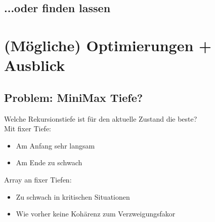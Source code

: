 \documentclass[12pt]{beamer}
\begin{document}
\subsection{...oder finden lassen}
\begin{frame}
\end{frame}

\section{(Mögliche) Optimierungen + Ausblick}
\subsection{Problem: MiniMax Tiefe?}
\begin{frame}
Welche Rekursionstiefe ist für den aktuelle Zustand die beste?\\
\pause
Mit fixer Tiefe:
\begin{itemize}
	\item Am Anfang sehr langsam
	\item Am Ende zu schwach
\end{itemize}
\pause
Array an fixer Tiefen:
\begin{itemize}
	\item Zu schwach in kritischen Situationen
	\item Wie vorher keine Kohärenz zum Verzweigungsfakor
\end{itemize}
\end{frame}
\end{document}
